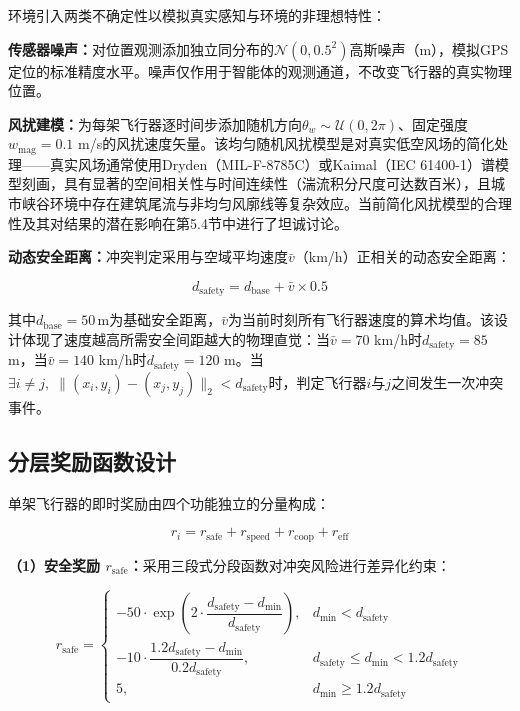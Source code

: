 \documentclass[12pt,a4paper,UTF8]{ctexart}
\begin{document}
环境引入两类不确定性以模拟真实感知与环境的非理想特性：

\textbf{传感器噪声：}对位置观测添加独立同分布的$\mathcal{N}(0, 0.5^2)$高斯噪声（m），模拟GPS定位的标准精度水平。噪声仅作用于智能体的观测通道，不改变飞行器的真实物理位置。

\textbf{风扰建模：}为每架飞行器逐时间步添加随机方向$\theta_w \sim \mathcal{U}(0, 2\pi)$、固定强度$w_{\text{mag}} = 0.1$ m/s的风扰速度矢量。该均匀随机风扰模型是对真实低空风场的简化处理——真实风场通常使用Dryden（MIL-F-8785C）\cite{ref20}或Kaimal（IEC 61400-1）谱模型刻画，具有显著的空间相关性与时间连续性（湍流积分尺度可达数百米），且城市峡谷环境中存在建筑尾流与非均匀风廓线等复杂效应。当前简化风扰模型的合理性及其对结果的潜在影响在第5.4节中进行了坦诚讨论。

\textbf{动态安全距离：}冲突判定采用与空域平均速度$\bar{v}$（km/h）正相关的动态安全距离：

\begin{equation}
    d_{\text{safety}} = d_{\text{base}} + \bar{v} \times 0.5
\end{equation}

其中$d_{\text{base}} = 50\,\text{m}$为基础安全距离，$\bar{v}$为当前时刻所有飞行器速度的算术均值。该设计体现了速度越高所需安全间距越大的物理直觉：当$\bar{v}=70$ km/h时$d_{\text{safety}}=85$ m，当$\bar{v}=140$ km/h时$d_{\text{safety}}=120$ m。当$\exists i \neq j,\; \|(x_i, y_i) - (x_j, y_j)\|_2 < d_{\text{safety}}$时，判定飞行器$i$与$j$之间发生一次冲突事件。

\subsection{分层奖励函数设计}

单架飞行器的即时奖励由四个功能独立的分量构成：

\begin{equation}
    r_i = r_{\text{safe}} + r_{\text{speed}} + r_{\text{coop}} + r_{\text{eff}}
\end{equation}

\textbf{（1）安全奖励 $r_{\text{safe}}$：}采用三段式分段函数对冲突风险进行差异化约束：

\begin{equation}
    r_{\text{safe}} =
    \begin{cases}
        -50 \cdot \exp\left(2 \cdot \dfrac{d_{\text{safety}} - d_{\min}}{d_{\text{safety}}}\right), & d_{\min} < d_{\text{safety}} \\[10pt]
        -10 \cdot \dfrac{1.2d_{\text{safety}} - d_{\min}}{0.2d_{\text{safety}}}, & d_{\text{safety}} \leq d_{\min} < 1.2d_{\text{safety}} \\[10pt]
        5, & d_{\min} \geq 1.2d_{\text{safety}}
    \end{cases}
\end{equation}
\end{document}
